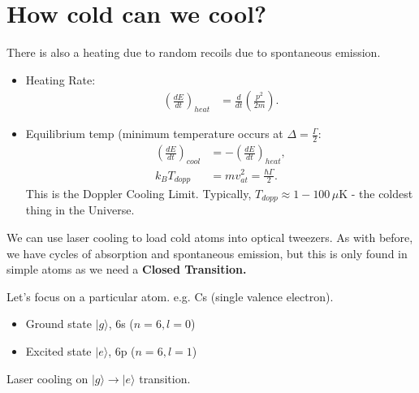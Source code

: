 \documentclass[lasers.tex]{subfiles}
\begin{document}
\section{How cold can we cool?}
There is also a heating due to random recoils due to spontaneous emission. 
\begin{figure}[H]
    \centering
\end{figure}
\begin{itemize}
    \item Heating Rate:
        \begin{align}
            \left(\frac{dE}{dt}\right)_{heat} &= \frac{d}{dt}\left(\frac{p^2}{2m}\right).
        \end{align}
    \item Equilibrium temp (minimum temperature occurs at $\Delta=\frac{\Gamma}{2}$:
        \begin{align}
            \left(\frac{dE}{dt}\right)_{cool} &= -\left(\frac{dE}{dt}\right)_{heat}, \\
            k_BT_{dopp} &= mv^2_{at} = \frac{\hbar\Gamma}{2}.
        \end{align}
        This is the Doppler Cooling Limit. 
        Typically, $T_{dopp}\approx1-100\,\mu$K - the coldest thing in the Universe. 

\end{itemize}   
We can use laser cooling to load cold atoms into optical tweezers. 
As with before, we have cycles of absorption and spontaneous emission, but this is only found in simple atoms as we need a \textbf{Closed Transition.}

Let's focus on a particular atom. e.g. Cs (single valence electron).
\begin{itemize}
    \item Ground state $|g\rangle$, 6s ($n=6,l=0$)
    \item Excited state $|e\rangle$, 6p ($n=6,l=1$)
\end{itemize}   
Laser cooling on $|g\rangle\to|e\rangle$ transition. 
\end{document}
